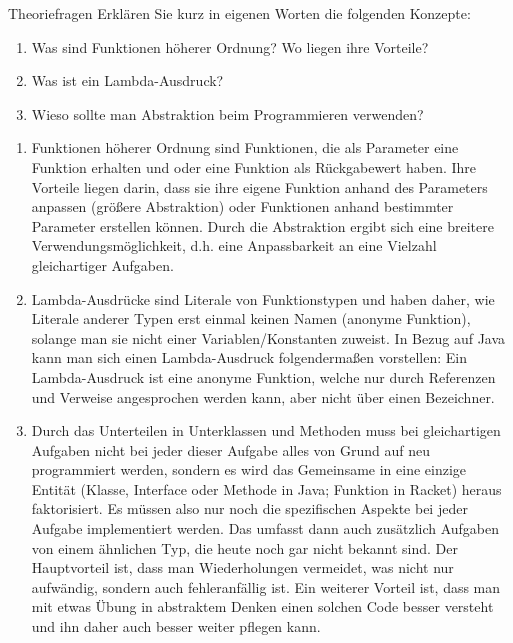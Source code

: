 \documentclass{../preamble}
\date{11.01.2021 - 15.01.2021}
\begin{document}
\maketitle

\makedisclaimer

\clearpage

\begin{task}[credit = \stars{0}{3}]{Theoriefragen}
    Erklären Sie kurz in eigenen Worten die folgenden Konzepte:
    \begin{enumerate}
        \item Was sind Funktionen höherer Ordnung? Wo liegen ihre Vorteile?
        \item Was ist ein Lambda-Ausdruck?
        \item Wieso sollte man Abstraktion beim Programmieren verwenden?
    \end{enumerate}

    \begin{solution}
        \begin{enumerate}
            \item Funktionen höherer Ordnung sind Funktionen, die als Parameter eine Funktion erhalten und oder eine Funktion als Rückgabewert haben. Ihre Vorteile liegen darin, dass sie ihre eigene Funktion anhand des Parameters anpassen (größere Abstraktion) oder Funktionen anhand bestimmter Parameter erstellen können. Durch die Abstraktion ergibt sich eine breitere Verwendungsmöglichkeit, d.h. eine Anpassbarkeit an eine Vielzahl gleichartiger Aufgaben.
            \item Lambda-Ausdrücke sind Literale von Funktionstypen und haben daher, wie Literale anderer Typen erst einmal keinen Namen (anonyme Funktion), solange man sie nicht einer Variablen/Konstanten zuweist.
                  \br
                  In Bezug auf Java kann man sich einen Lambda-Ausdruck folgendermaßen vorstellen: Ein Lambda-Ausdruck ist eine anonyme Funktion, welche nur durch Referenzen und Verweise angesprochen werden kann, aber nicht über einen Bezeichner.
            \item Durch das Unterteilen in Unterklassen und Methoden muss bei gleichartigen Aufgaben nicht bei jeder dieser Aufgabe alles von Grund auf neu programmiert werden, sondern es wird das Gemeinsame in eine einzige Entität (Klasse, Interface oder Methode in Java; Funktion in Racket) heraus faktorisiert. Es müssen also nur noch die spezifischen Aspekte bei jeder Aufgabe implementiert werden. Das umfasst dann auch zusätzlich Aufgaben von einem ähnlichen Typ, die heute noch gar nicht bekannt sind. Der Hauptvorteil ist, dass man Wiederholungen vermeidet, was nicht nur aufwändig, sondern auch fehleranfällig ist. Ein weiterer Vorteil ist, dass man mit etwas Übung in abstraktem Denken einen solchen Code besser versteht und ihn daher auch besser weiter pflegen kann.
        \end{enumerate}
    \end{solution}
\end{task}
\end{document}
